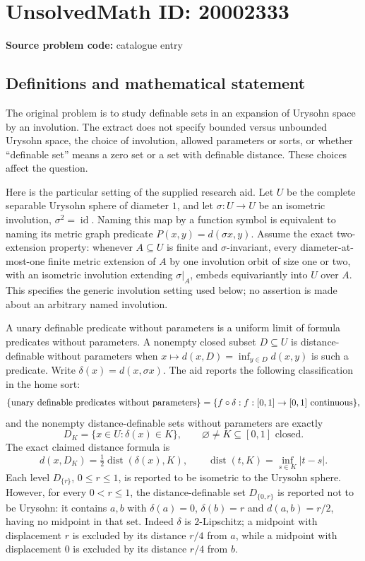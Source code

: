 \documentclass[11pt]{article}
\begin{document}
\section*{UnsolvedMath ID: 20002333}
\textbf{Source problem code:} catalogue entry
\subsection{Definitions and mathematical statement}
The original problem is to study definable sets in an expansion of Urysohn space by an involution. The extract does not specify bounded versus unbounded Urysohn space, the choice of involution, allowed parameters or sorts, or whether ``definable set'' means a zero set or a set with definable distance. These choices affect the question.

Here is the particular setting of the supplied research aid. Let $U$ be the complete separable Urysohn sphere of diameter $1$, and let $\sigma:U\to U$ be an isometric involution, $\sigma^2=\operatorname{id}$. Naming this map by a function symbol is equivalent to naming its metric graph predicate $P(x,y)=d(\sigma x,y)$. Assume the exact two-extension property: whenever $A\subseteq U$ is finite and $\sigma$-invariant, every diameter-at-most-one finite metric extension of $A$ by one involution orbit of size one or two, with an isometric involution extending $\sigma|_A$, embeds equivariantly into $U$ over $A$. This specifies the generic involution setting used below; no assertion is made about an arbitrary named involution.

A unary definable predicate without parameters is a uniform limit of formula predicates without parameters. A nonempty closed subset $D\subseteq U$ is distance-definable without parameters when $x\mapsto d(x,D)=\inf_{y\in D}d(x,y)$ is such a predicate. Write $\delta(x)=d(x,\sigma x)$. The aid reports the following classification in the home sort:
\[
 \{\hbox{unary definable predicates without parameters}\}
 =\{f\circ\delta:f:[0,1]\to[0,1]\text{ continuous}\},
\]
and the nonempty distance-definable sets without parameters are exactly
\[
 D_K=\{x\in U:\delta(x)\in K\},
 \qquad\varnothing\ne K\subseteq[0,1]\text{ closed}.
\]
The exact claimed distance formula is
\[
 d(x,D_K)=\tfrac12\operatorname{dist}(\delta(x),K),
 \qquad \operatorname{dist}(t,K)=\inf_{s\in K}|t-s|.
\]
Each level $D_{\{r\}}$, $0\le r\le1$, is reported to be isometric to the Urysohn sphere. However, for every $0<r\le1$, the distance-definable set $D_{\{0,r\}}$ is reported not to be Urysohn: it contains $a,b$ with $\delta(a)=0$, $\delta(b)=r$ and $d(a,b)=r/2$, having no midpoint in that set. Indeed $\delta$ is $2$-Lipschitz; a midpoint with displacement $r$ is excluded by its distance $r/4$ from $a$, while a midpoint with displacement $0$ is excluded by its distance $r/4$ from $b$.
\end{document}
